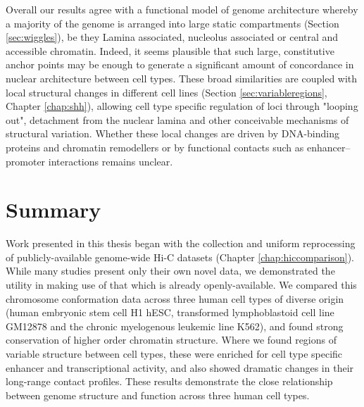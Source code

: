\documentclass[a4paper,11pt,oneside]{book}
\begin{document}
Overall our results agree with a functional model of genome architecture whereby a majority of the genome is arranged into large static compartments (Section \ref{sec:wiggles}), be they Lamina associated, nucleolus associated or central and accessible chromatin. Indeed, it seems plausible that such large, constitutive anchor points may be enough to generate a significant amount of concordance in nuclear architecture between cell types.\cite{Bouwman2015a} These broad similarities are coupled with local structural changes in different cell lines (Section \ref{sec:variableregions}, Chapter \ref{chap:shh}), allowing cell type specific regulation of loci through "looping out", detachment from the nuclear lamina and other conceivable mechanisms of structural variation. Whether these local changes are driven by DNA-binding proteins and chromatin remodellers or by functional contacts such as enhancer--promoter interactions remains unclear.

\section{Summary}




Work presented in this thesis began with the collection and uniform reprocessing of publicly-available genome-wide Hi-C datasets (Chapter \ref{chap:hiccomparison}). While many studies present only their own novel data, we demonstrated the utility in making use of that which is already openly-available. We compared this chromosome conformation data across three human cell types of diverse origin (human embryonic stem cell H1 hESC, transformed lymphoblastoid cell line GM12878 and the chronic myelogenous leukemic line K562), and found strong conservation of higher order chromatin structure. Where we found regions of variable structure between cell types, these were enriched for cell type specific enhancer and transcriptional activity, and also showed dramatic changes in their long-range contact profiles. These results demonstrate the close relationship between genome structure and function across three human cell types.
 
\end{document}
